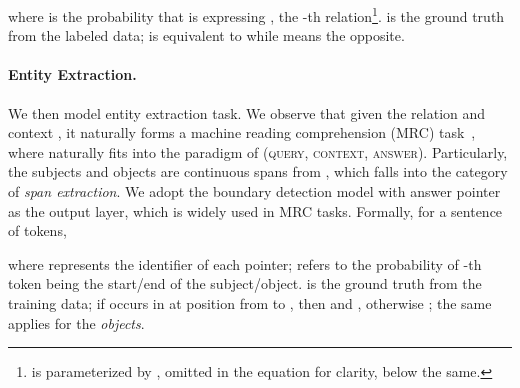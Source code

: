 \documentclass[11pt,a4paper]{article}
\begin{document}
where  is the probability that  is expressing , the -th relation\footnote{ is parameterized by , omitted in the equation for clarity, below the same.}.
 is the ground truth from the labeled data;  is equivalent to  while  means the opposite.

\paragraph*{Entity Extraction.} 
We then model entity extraction task. 
We observe that given the relation  and context , it naturally forms a machine reading comprehension (MRC) task~\cite{chen2018neural}, where  naturally fits into the paradigm of (\textsc{query, context, answer}).
Particularly, the subjects and objects are continuous spans from , which falls into the category of \textit{span extraction}.
We adopt the boundary detection model with answer pointer~\cite{wang2016machine} as the output layer, which is widely used in MRC tasks.
Formally, for a sentence of  tokens,

where  represents the identifier of each pointer;  refers to the probability of -th token being the start/end of the subject/object.
 is the ground truth from the training data;
if  occurs in  at position from  to , then  and , otherwise ; the same applies for the \textit{objects}.
\end{document}

